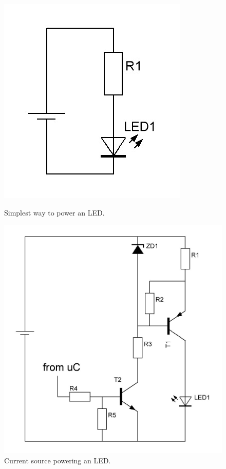 \begin{figure}[!tbp]
  \centering
  \begin{minipage}[b]{0.3\textwidth}
    \includegraphics[width=\textwidth]{chapters/hardware-chapters/dc-led-resistor.jpg}
    \caption{Simplest way to power an LED.}
	\label{fig:dc-led-resistor}
  \end{minipage}
  \hfill
  \begin{minipage}[b]{0.65\textwidth}
    \includegraphics[width=\textwidth]{chapters/hardware-chapters/dc-led-current-source.jpg}
    \caption{Current source powering an LED.}
	\label{fig:dc-led-current-source}
  \end{minipage}
\end{figure}
